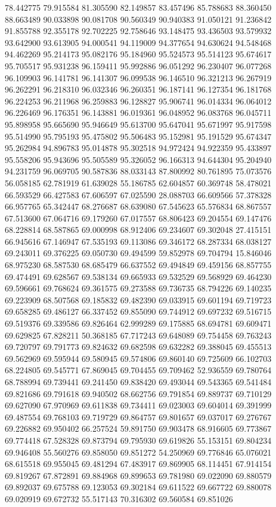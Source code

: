 78.442775
79.915584
81.305590
82.149857
83.457496
85.788683
88.360450
88.663489
90.033898
90.081708
90.560349
90.940383
91.050121
91.236842
91.855788
92.355178
92.702225
92.758646
93.148475
93.436503
93.579932
93.642900
93.613905
94.000541
94.119009
94.377654
94.630624
94.548468
94.462269
95.214173
95.082176
95.184960
95.524573
95.514123
95.674617
95.705517
95.931238
96.159411
95.992886
96.051292
96.230407
96.077268
96.109903
96.141781
96.141307
96.099538
96.146510
96.321213
96.267919
96.262291
96.218310
96.032346
96.260351
96.187141
96.127354
96.181768
96.224253
96.211968
96.259883
96.128827
95.906741
96.014334
96.064012
96.226469
96.176351
96.143881
96.019361
96.048952
96.083768
96.045711
95.898958
95.665690
95.946649
95.613700
95.647041
95.671997
95.917598
95.514990
95.795193
95.475802
95.506483
95.152981
95.191529
95.674347
95.262984
94.896783
95.014878
95.302518
94.972424
94.922359
95.433897
95.558206
95.943696
95.505589
95.326052
96.166313
94.644304
95.204940
94.231759
96.069705
90.587836
88.033143
87.800992
80.761895
75.073576
56.058185
62.781919
61.639028
55.186785
62.604857
60.369748
58.478021
66.593529
66.427583
67.606597
67.025590
28.088703
66.609566
57.378328
66.957765
65.342447
68.276687
68.639080
67.545623
65.576834
68.867557
67.513600
67.064716
69.179260
67.017557
68.806423
69.204554
69.147476
68.228814
68.587865
69.000998
68.912406
69.234607
69.302048
27.415151
66.945616
67.146947
67.535193
69.113086
69.346172
68.287334
68.038127
69.243011
69.376225
69.050730
69.494599
59.852978
69.704794
15.846046
68.975230
68.587530
68.685479
66.637552
69.494849
69.459156
68.857755
69.474491
69.628567
69.538134
69.665933
69.532529
69.568929
69.464230
69.596661
69.768624
69.361575
69.273588
69.736735
68.794226
69.140235
69.223909
68.507568
69.185832
69.482390
69.033915
69.601194
69.719723
69.658285
69.486127
66.337452
69.855090
69.744912
69.697232
69.516715
69.519376
69.339586
69.826464
62.999289
69.175885
68.694781
69.609471
69.629825
67.828211
50.368185
67.717243
69.648089
69.754458
69.763243
69.720797
69.791773
69.824632
69.682598
69.632282
69.388045
69.455513
69.562969
69.595944
69.580945
69.574806
69.860140
69.725609
66.102703
68.224805
69.545771
67.869045
69.704455
69.709462
52.936559
69.780764
68.788994
69.739441
69.241450
69.838420
69.493044
69.543365
69.541484
69.821686
69.791618
69.940502
68.662756
69.791854
69.889737
69.710129
69.627090
67.970969
69.611838
69.734411
69.023003
69.604014
69.391999
69.487554
69.768103
69.719729
69.864757
69.801657
69.037017
69.276767
69.226882
69.950402
66.257524
59.891750
69.903478
68.916605
69.773867
69.774418
67.528328
69.873794
69.795930
69.619826
55.153151
69.804234
69.946408
55.560276
69.858050
69.851272
54.250969
69.776846
65.076021
68.615518
69.955045
69.481294
67.483917
69.869905
68.114451
67.914154
69.819267
67.872891
69.884968
69.899653
69.781980
69.022090
69.880579
69.892037
69.675788
69.123053
69.302184
69.611522
69.667722
69.880078
69.020919
69.672732
55.517143
70.316302
69.560584
69.851026
